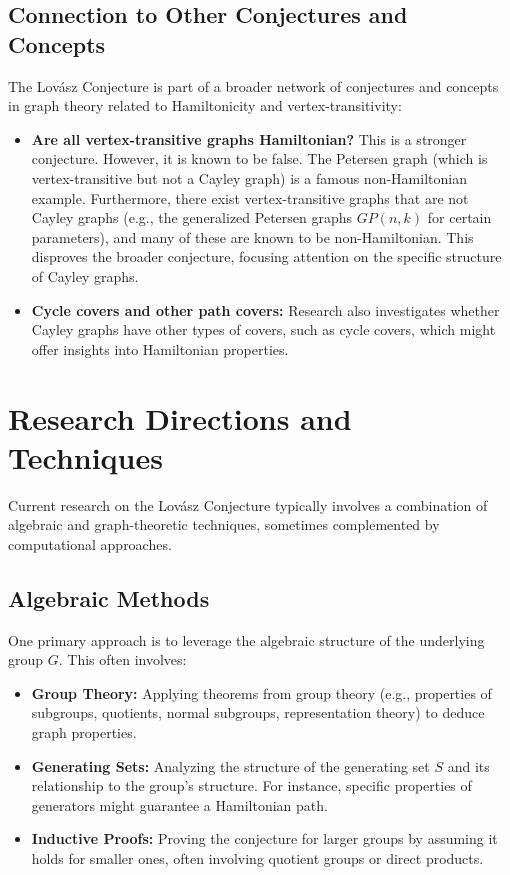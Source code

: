 \documentclass[12pt]{article}
\theoremstyle{remark}
\begin{document}
\subsection{Connection to Other Conjectures and Concepts}
The Lovász Conjecture is part of a broader network of conjectures and concepts in graph theory related to Hamiltonicity and vertex-transitivity:
\begin{itemize}
    \item \textbf{Are all vertex-transitive graphs Hamiltonian?} This is a stronger conjecture. However, it is known to be false. The Petersen graph (which is vertex-transitive but not a Cayley graph) is a famous non-Hamiltonian example. Furthermore, there exist vertex-transitive graphs that are not Cayley graphs (e.g., the generalized Petersen graphs $GP(n,k)$ for certain parameters), and many of these are known to be non-Hamiltonian. This disproves the broader conjecture, focusing attention on the specific structure of Cayley graphs.
    \item \textbf{Cycle covers and other path covers:} Research also investigates whether Cayley graphs have other types of covers, such as cycle covers, which might offer insights into Hamiltonian properties.
\end{itemize}

\section{Research Directions and Techniques}
Current research on the Lovász Conjecture typically involves a combination of algebraic and graph-theoretic techniques, sometimes complemented by computational approaches.

\subsection{Algebraic Methods}
One primary approach is to leverage the algebraic structure of the underlying group $G$. This often involves:
\begin{itemize}
    \item \textbf{Group Theory:} Applying theorems from group theory (e.g., properties of subgroups, quotients, normal subgroups, representation theory) to deduce graph properties.
    \item \textbf{Generating Sets:} Analyzing the structure of the generating set $S$ and its relationship to the group's structure. For instance, specific properties of generators might guarantee a Hamiltonian path.
    \item \textbf{Inductive Proofs:} Proving the conjecture for larger groups by assuming it holds for smaller ones, often involving quotient groups or direct products.
\end{itemize}
\end{document}
